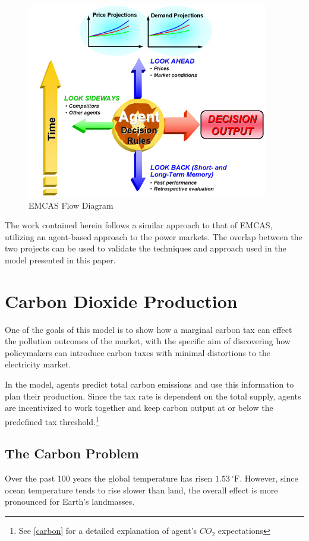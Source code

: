 \documentclass[12pt]{article}
\begin{document}
\begin{figure}[H]
	\begin{center}
	\includegraphics[scale = .75]{EMCAS}
	\caption{EMCAS Flow Diagram \cite{EMCAS}}
	\end{center}
\end{figure}

The work contained herein follows a similar approach to that of EMCAS, utilizing an agent-based approach to the power markets. The overlap between the two projects can be used to validate the techniques and approach used in the model presented in this paper.

  

\section{Carbon Dioxide Production}


One of the goals of this model is to show how a marginal carbon tax can effect the pollution outcomes of the market, with the specific aim of discovering how policymakers can introduce carbon taxes with minimal distortions to the electricity market. \*

In the model, agents predict total carbon emissions and use this information to plan their production. Since the tax rate is dependent on the total supply, agents are incentivized to work together and keep carbon output at or below the predefined tax threshold.\footnote{See \cref{carbon} for a detailed explanation of agent's $CO_2$ expectations}  

\subsection{The Carbon Problem}
Over the past 100 years the global temperature has risen $1.53\,^{\circ}\mathrm{F}$. However, since ocean temperature tends to rise slower than land, the overall effect is more pronounced for Earth's landmasses. 
\end{document}
